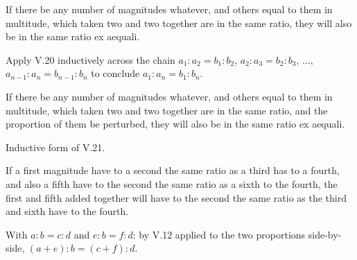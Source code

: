 \documentclass{rrxiv}
\begin{document}
\begin{claim}
\label{prop:V.22}
If there be any number of magnitudes whatever, and others equal to
them in multitude, which taken two and two together are in the same
ratio, they will also be in the same ratio ex aequali.
\end{claim}
\begin{evidence}[Proof of V.22]
\label{ev:V.22}
Apply V.20 inductively across the chain $a_1 : a_2 = b_1 : b_2$, $a_2
: a_3 = b_2 : b_3$, $\dots$, $a_{n-1} : a_n = b_{n-1} : b_n$ to
conclude $a_1 : a_n = b_1 : b_n$.
\end{evidence}

\begin{claim}
\label{prop:V.23}
If there be any number of magnitudes whatever, and others equal to
them in multitude, which taken two and two together are in the same
ratio, and the proportion of them be perturbed, they will also be in
the same ratio ex aequali.
\end{claim}
\begin{evidence}[Proof of V.23]
\label{ev:V.23}
Inductive form of V.21.
\end{evidence}

\begin{claim}
\label{prop:V.24}
If a first magnitude have to a second the same ratio as a third has
to a fourth, and also a fifth have to the second the same ratio as a
sixth to the fourth, the first and fifth added together will have to
the second the same ratio as the third and sixth have to the fourth.
\end{claim}
\begin{evidence}[Proof of V.24]
\label{ev:V.24}
With $a : b = c : d$ and $e : b = f : d$: by V.12 applied to the two
proportions side-by-side, $(a + e) : b = (c + f) : d$.
\end{evidence}
\end{document}

